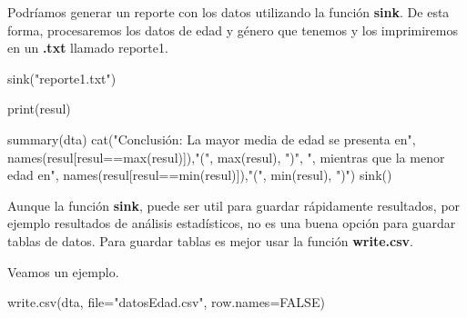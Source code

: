 \documentclass[
]{article}
\newenvironment{Shaded}{\begin{snugshade}}{\end{snugshade}}
\newcommand{\AttributeTok}[1]{\textcolor[rgb]{0.77,0.63,0.00}{#1}}
\newcommand{\ConstantTok}[1]{\textcolor[rgb]{0.00,0.00,0.00}{#1}}
\newcommand{\DecValTok}[1]{\textcolor[rgb]{0.00,0.00,0.81}{#1}}
\newcommand{\FunctionTok}[1]{\textcolor[rgb]{0.00,0.00,0.00}{#1}}
\newcommand{\NormalTok}[1]{#1}
\newcommand{\OtherTok}[1]{\textcolor[rgb]{0.56,0.35,0.01}{#1}}
\newcommand{\SpecialCharTok}[1]{\textcolor[rgb]{0.00,0.00,0.00}{#1}}
\newcommand{\StringTok}[1]{\textcolor[rgb]{0.31,0.60,0.02}{#1}}
\begin{document}
Podríamos generar un reporte con los datos utilizando la función
\textbf{sink}. De esta forma, procesaremos los datos de edad y género
que tenemos y los imprimiremos en un \textbf{.txt} llamado reporte1.

\begin{Shaded}
\end{Shaded}

\begin{Shaded}
\begin{Highlighting}[]
\FunctionTok{sink}\NormalTok{(}\StringTok{"reporte1.txt"}\NormalTok{)}

\FunctionTok{print}\NormalTok{(resul)}

\FunctionTok{summary}\NormalTok{(dta)}
\FunctionTok{cat}\NormalTok{(}\StringTok{"Conclusión: La mayor media de edad se presenta en"}\NormalTok{,}
    \FunctionTok{names}\NormalTok{(resul[resul}\SpecialCharTok{==}\FunctionTok{max}\NormalTok{(resul)]),}\StringTok{"("}\NormalTok{, }\FunctionTok{max}\NormalTok{(resul), }\StringTok{")"}\NormalTok{, }
     \StringTok{", mientras que la menor edad en"}\NormalTok{, }
    \FunctionTok{names}\NormalTok{(resul[resul}\SpecialCharTok{==}\FunctionTok{min}\NormalTok{(resul)]),}\StringTok{"("}\NormalTok{, }\FunctionTok{min}\NormalTok{(resul), }\StringTok{")"}\NormalTok{)}
\FunctionTok{sink}\NormalTok{()}
\end{Highlighting}
\end{Shaded}

Aunque la función \textbf{sink}, puede ser util para guardar rápidamente
resultados, por ejemplo resultados de análisis estadísticos, no es una
buena opción para guardar tablas de datos. Para guardar tablas es mejor
usar la función \textbf{write.csv}.

Veamos un ejemplo.

\begin{Shaded}
\begin{Highlighting}[]
\FunctionTok{write.csv}\NormalTok{(dta, }\AttributeTok{file=}\StringTok{"datosEdad.csv"}\NormalTok{, }\AttributeTok{row.names=}\ConstantTok{FALSE}\NormalTok{)}
\end{Highlighting}
\end{Shaded}
\end{document}
